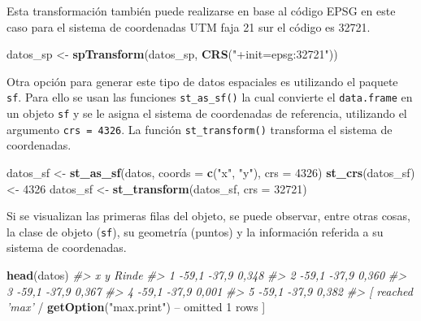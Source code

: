 \documentclass[11pt,b5paper,]{krantz}
\newenvironment{Shaded}{}{}
\newcommand{\KeywordTok}[1]{\textcolor[rgb]{0.00,0.44,0.13}{\textbf{#1}}}
\newcommand{\DataTypeTok}[1]{\textcolor[rgb]{0.56,0.13,0.00}{#1}}
\newcommand{\DecValTok}[1]{\textcolor[rgb]{0.25,0.63,0.44}{#1}}
\newcommand{\StringTok}[1]{\textcolor[rgb]{0.25,0.44,0.63}{#1}}
\newcommand{\CommentTok}[1]{\textcolor[rgb]{0.38,0.63,0.69}{\textit{#1}}}
\newcommand{\OperatorTok}[1]{\textcolor[rgb]{0.40,0.40,0.40}{#1}}
\newcommand{\NormalTok}[1]{#1}
\begin{document}
Esta transformación también puede realizarse en base al código EPSG en
este caso para el sistema de coordenadas UTM faja 21 sur el código es
32721.

\begin{Shaded}
\begin{Highlighting}[]
\NormalTok{datos_sp <-}\StringTok{ }
\StringTok{  }\KeywordTok{spTransform}\NormalTok{(datos_sp, }
              \KeywordTok{CRS}\NormalTok{(}\StringTok{"+init=epsg:32721"}\NormalTok{))}
\end{Highlighting}
\end{Shaded}

Otra opción para generar este tipo de datos espaciales es utilizando el
paquete \texttt{sf}. Para ello se usan las funciones
\texttt{st\_as\_sf()} la cual convierte el \texttt{data.frame} en un
objeto \texttt{sf} y se le asigna el sistema de coordenadas de
referencia, utilizando el argumento \texttt{crs\ =\ 4326}. La función
\texttt{st\_transform()} transforma el sistema de coordenadas.

\begin{Shaded}
\begin{Highlighting}[]
\NormalTok{datos_sf <-}\StringTok{ }\KeywordTok{st_as_sf}\NormalTok{(datos, }
                     \DataTypeTok{coords =} \KeywordTok{c}\NormalTok{(}\StringTok{"x"}\NormalTok{, }\StringTok{"y"}\NormalTok{), }
                     \DataTypeTok{crs =} \DecValTok{4326}\NormalTok{)}
\KeywordTok{st_crs}\NormalTok{(datos_sf) <-}\StringTok{ }\DecValTok{4326}
\NormalTok{datos_sf <-}\StringTok{ }\KeywordTok{st_transform}\NormalTok{(datos_sf, }\DataTypeTok{crs =} \DecValTok{32721}\NormalTok{)}
\end{Highlighting}
\end{Shaded}

Si se visualizan las primeras filas del objeto, se puede observar, entre
otras cosas, la clase de objeto (\texttt{sf}), su geometría (puntos) y
la información referida a su sistema de coordenadas.

\begin{Shaded}
\begin{Highlighting}[]
\KeywordTok{head}\NormalTok{(datos)}
\CommentTok{#> x y Rinde}
\CommentTok{#> 1 -59,1 -37,9 0,348}
\CommentTok{#> 2 -59,1 -37,9 0,360}
\CommentTok{#> 3 -59,1 -37,9 0,367}
\CommentTok{#> 4 -59,1 -37,9 0,001}
\CommentTok{#> 5 -59,1 -37,9 0,382}
\CommentTok{#> [ reached 'max'}
    \OperatorTok{/}\StringTok{ }\KeywordTok{getOption}\NormalTok{(}\StringTok{"max.print"}\NormalTok{) }\OperatorTok{--}
\NormalTok{omitted }\DecValTok{1}\NormalTok{ rows ]}
\end{Highlighting}
\end{Shaded}
\end{document}
